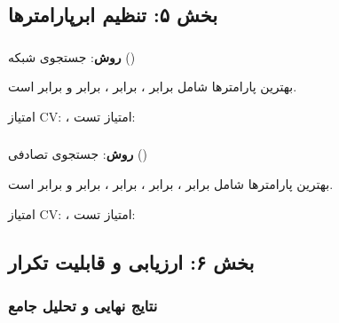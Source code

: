 \documentclass{article}
\begin{document}
\subsection{بخش ۵: تنظیم ابرپارامترها}

\subsubsection{}

\textbf{روش}: جستجوی شبکه ()

بهترین پارامترها شامل  برابر ،  برابر ،  برابر  و  برابر  است.

امتیاز CV: ، امتیاز تست: 

\subsubsection{}

\textbf{روش}: جستجوی تصادفی ()

بهترین پارامترها شامل  برابر ،  برابر ،  برابر ،  برابر  و  برابر  است.

امتیاز CV: ، امتیاز تست: 

\subsection{بخش ۶: ارزیابی و قابلیت تکرار}

\subsubsection{نتایج نهایی و تحلیل جامع}
\end{document}
